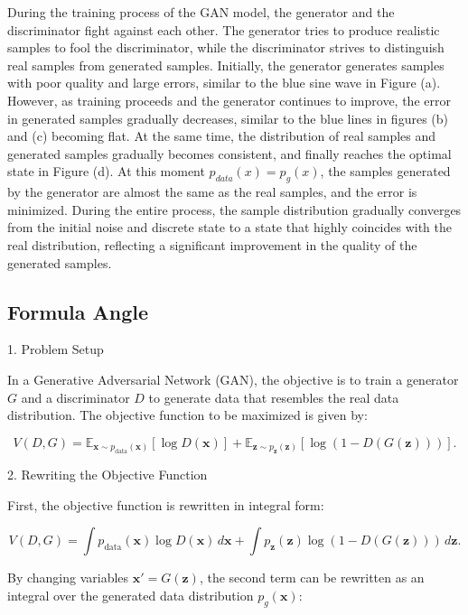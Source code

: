 During the training process of the GAN model, the generator and the discriminator fight against each other. 
The generator tries to produce realistic samples to fool the discriminator, while the discriminator strives 
to distinguish real samples from generated samples. Initially, the generator generates samples with poor 
quality and large errors, similar to the blue sine wave in Figure (a). However, as training proceeds and 
the generator continues to improve, the error in generated samples gradually decreases, similar to the 
blue lines in figures (b) and (c) becoming flat. At the same time, the distribution of real samples and 
generated samples gradually becomes consistent, and finally reaches the optimal state in Figure (d). At this moment $p_{data}(x) = p_g(x)$, 
the samples generated by the generator are almost the same as the real samples, and the error is minimized. 
During the entire process, the sample distribution gradually converges from the initial noise and discrete 
state to a state that highly coincides with the real distribution, reflecting a significant improvement in 
the quality of the generated samples.


\subsection{Formula Angle}


1. Problem Setup

In a Generative Adversarial Network (GAN), the objective is to train a generator \( G \) and a discriminator \( D \) to generate data that resembles the real data distribution. The objective function to be maximized is given by:

\begin{equation}
    V(D, G) = \mathbb{E}_{\mathbf{x} \sim p_{\text{data}}(\mathbf{x})} [\log D(\mathbf{x})] + \mathbb{E}_{\mathbf{z} \sim p_{\mathbf{z}}(\mathbf{z})} [\log (1 - D(G(\mathbf{z})))].
\end{equation}

2. Rewriting the Objective Function

First, the objective function is rewritten in integral form:

\begin{equation}
    V(D, G) = \int p_{\text{data}}(\mathbf{x}) \log D(\mathbf{x}) \, d\mathbf{x} + \int p_{\mathbf{z}}(\mathbf{z}) \log (1 - D(G(\mathbf{z}))) \, d\mathbf{z}.
\end{equation}

By changing variables \(\mathbf{x}' = G(\mathbf{z})\), the second term can be rewritten as an integral over the generated data distribution \( p_g(\mathbf{x}) \):

